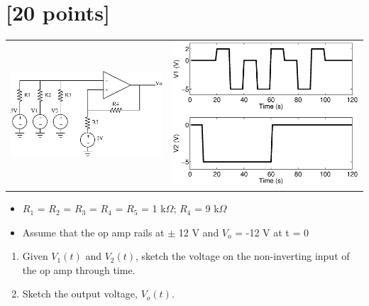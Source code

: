 \documentclass[12pt]{article}
\begin{document}


\clearpage



\section{[20 points]}

\begin{center}
\begin{tabular}{cc}
\includegraphics[width=0.6\linewidth]{sum_comparator.eps} &
\includegraphics[width=0.4\linewidth]{sum_comparator_v1_v2.eps} \\
\end{tabular}
\end{center}

\begin{itemize}
\item $R_1$ = $R_2$ = $R_3$ = $R_4$ = $R_5$ = 1 k$\Omega$; $R_4$ = 9 k$\Omega$
\item Assume that the op amp rails at $\pm$ 12 V and $V_o$ = -12 V at t = 0
\end{itemize}

\begin{enumerate}
\item Given $V_1(t)$ and $V_2(t)$, sketch the voltage on the non-inverting input of
the op amp through time.
\item Sketch the output voltage, $V_o(t)$.
\end{enumerate}

\clearpage



\clearpage
\end{document}
